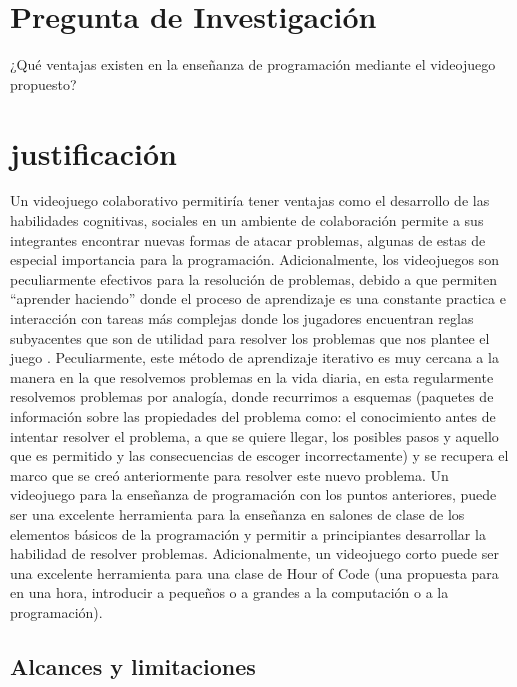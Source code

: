 \section{Pregunta de Investigación}
¿Qué ventajas existen en la enseñanza de programación mediante el videojuego propuesto?

\section{justificación}
Un videojuego colaborativo permitiría tener ventajas como el desarrollo de las habilidades cognitivas, sociales en un ambiente de colaboración permite a sus integrantes encontrar nuevas formas de atacar problemas, algunas de estas de especial importancia para la programación. 
Adicionalmente, los videojuegos son peculiarmente efectivos para la resolución de problemas, debido a que permiten “aprender haciendo” donde el proceso de aprendizaje es una constante practica e interacción con tareas más complejas donde los jugadores encuentran reglas subyacentes que son de utilidad para resolver los problemas que nos plantee el juego \cite{monjelat-a}. Peculiarmente, este método de aprendizaje iterativo es muy cercana a la manera en la que resolvemos problemas en la vida diaria, en esta regularmente resolvemos problemas por analogía, donde recurrimos a esquemas (paquetes de información sobre las propiedades del problema como: el conocimiento antes de intentar resolver el problema, a que se quiere llegar, los posibles pasos y aquello que es permitido y las consecuencias de escoger incorrectamente) y se recupera el marco que se creó anteriormente para resolver este nuevo problema.
Un videojuego para la enseñanza de programación con los puntos anteriores, puede ser una excelente herramienta para la enseñanza en salones de clase de los elementos básicos de la programación y permitir a principiantes desarrollar la habilidad de resolver problemas. Adicionalmente, un videojuego corto puede ser una excelente herramienta para una clase de Hour of Code (una propuesta para en una hora, introducir a pequeños o a grandes a la computación o a la programación).


\subsection{Alcances y limitaciones}
